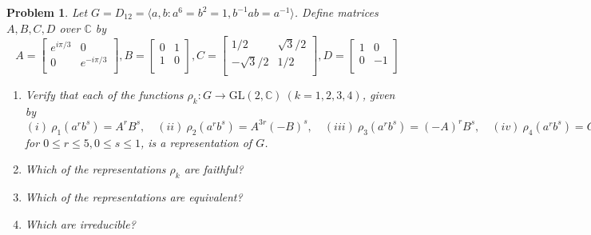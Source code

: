 \documentclass[10pt]{article}
\newcommand{\bb}[1]{\mathbb{#1}}
\theoremstyle{plain}
\newtheorem{problem}{Problem}
\theoremstyle{remark}
\begin{document}
\begin{problem}
  Let $G=D_{12}=\langle a,b:a^6=b^2=1,b^{-1}ab=a^{-1}\rangle$.
  Define matrices $A,B,C,D$ over $\bb{C}$ by
  \[
    A
    =
    \left[
      \begin{array}{cc}
        e^{i\pi/3} & 0\\
        0 & e^{-i\pi/3}\\
      \end{array}
    \right],
    B
    =
    \left[
      \begin{array}{cc}
        0 & 1\\
        1 & 0\\
      \end{array}
    \right],
    C
    =
    \left[
      \begin{array}{cc}
        1/2 & \sqrt{3}/2\\
        -\sqrt{3}/2 & 1/2\\
      \end{array}
    \right],
    D
    =
    \left[
      \begin{array}{cc}
        1 & 0\\
        0 & -1\\
      \end{array}
    \right]
  \]
  \begin{enumerate}
  \item[(a)] Verify that each of the functions
    $\rho_k:G\rightarrow\text{GL}(2,\bb{C})\ (k=1,2,3,4)$, given by
    $(i)\ \rho_1(a^r b^s)=A^r B^s,\quad
    (ii)\ \rho_2(a^r b^s)= A^{3r}(-B)^s,\quad
    (iii)\ \rho_3(a^r b^s)=(-A)^r B^s,\quad
    (iv)\ \rho_4(a^r b^s)=C^r D^s$
    for $0\leq r\leq 5, 0\leq s\leq 1$, is a representation of $G$.
  \item[(b)] Which of the representations $\rho_k$ are faithful?
  \item[(c)] Which of the representations are equivalent?
  \item[(d)] Which are irreducible?
  \end{enumerate}
\end{problem}
\end{document}
